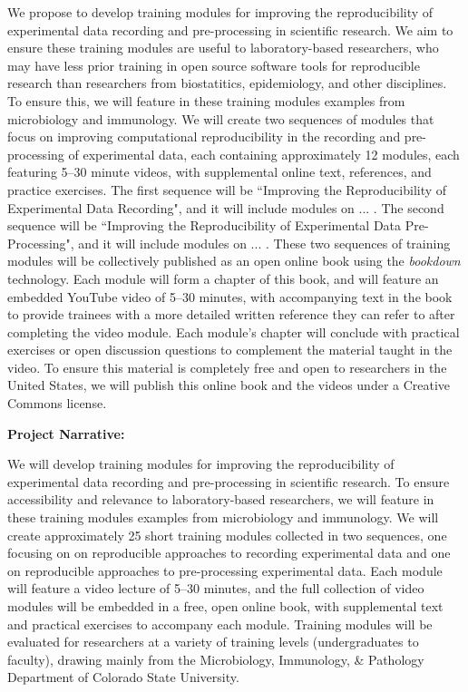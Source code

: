 \documentclass[pdftex,english,11pt,parskip=half]{scrartcl}
\begin{document}
We propose to develop training modules for improving the reproducibility of experimental data recording and pre-processing in scientific research. We aim to ensure these training modules are useful to laboratory-based researchers, who may have less prior training in open source software tools for reproducible research than researchers from biostatitics, epidemiology, and other disciplines. To ensure this, we will feature in these training modules examples from microbiology and immunology. We will create two sequences of modules that focus on improving computational reproducibility in the recording and pre-processing of experimental data, each containing approximately 12 modules, each featuring 5--30 minute videos, with supplemental online text, references, and practice exercises. The first sequence will be ``Improving the Reproducibility of Experimental Data Recording", and it will include modules on ... . The second sequence will be ``Improving the Reproducibility of Experimental Data Pre-Processing", and it will include modules on ... . These two sequences of training modules will be collectively published as an open online book using the \textit{bookdown} technology. Each module will form a chapter of this book, and will feature an embedded YouTube video of 5--30 minutes, with accompanying text in the book to provide trainees with a more detailed written reference they can refer to after completing the video module. Each module's chapter will conclude with practical exercises or open discussion questions to complement the material taught in the video. To ensure this material is completely free and open to researchers in the United States, we will publish this online book and the videos under a Creative Commons license.

\clearpage

{\large \textbf{Project Narrative:}}

We will develop training modules for improving the reproducibility of experimental data recording and pre-processing in scientific research. To ensure accessibility and relevance to laboratory-based researchers, we will feature in these training modules examples from microbiology and immunology. We will create approximately 25 short training modules collected in two sequences, one focusing on on reproducible approaches to recording experimental data and one on reproducible approaches to pre-processing experimental data. Each module will feature a video lecture of 5--30 minutes, and the full collection of video modules will be embedded in a free, open online book, with supplemental text and practical exercises to accompany each module. Training modules will be evaluated for researchers at a variety of training levels (undergraduates to faculty), drawing mainly from the Microbiology, Immunology, \& Pathology Department of Colorado State University.
\end{document}
